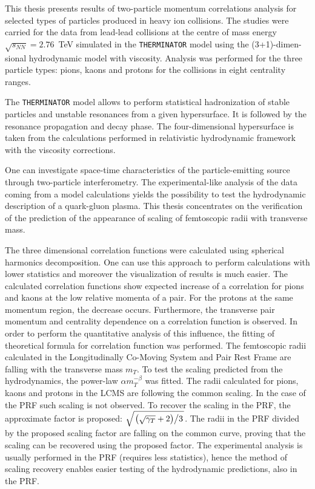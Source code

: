 
This thesis presents results of two-particle momentum correlations analysis for selected types of particles produced in heavy ion collisions.
The studies were carried for the data from lead-lead collisions at the centre of mass energy \mbox{$\sqrt{s_{NN}}=2.76$~TeV} simulated in the \verb|THERMINATOR| model using the (3+1)-dimen-sional hydrodynamic model with viscosity.
Analysis was performed for the three particle types: pions, kaons and protons for the collisions in eight centrality ranges.

The \verb|THERMINATOR| model allows to perform statistical hadronization of stable particles and unstable resonances from a given hypersurface.
It is followed by the resonance propagation and decay phase.
The four-dimensional hypersurface is taken from the calculations performed in relativistic hydrodynamic framework with the viscosity corrections.

One can investigate space-time characteristics of the particle-emitting source through two-particle interferometry.
The experimental-like analysis of the data coming from a model calculations yields the possibility to test the hydrodynamic description of a quark-gluon plasma.
This thesis concentrates on the verification of the prediction of the appearance of scaling of femtoscopic radii with transverse mass.

The three dimensional correlation functions were calculated using spherical harmonics decomposition.
One can use this approach to perform calculations with lower statistics and moreover the visualization of results is much easier.
The calculated correlation functions show expected increase of a correlation for pions and kaons at the low relative momenta of a pair.
For the protons at the same momentum region, the decrease occurs.
Furthermore, the transverse pair momentum and centrality dependence on a correlation function is observed.
In order to perform the quantitative analysis of this influence, the fitting of theoretical formula for correlation function was performed.
The femtoscopic radii calculated in the Longitudinally Co-Moving System and Pair Rest Frame are falling with the transverse mass $m_T$.
To test the scaling predicted from the hydrodynamics, the power-law $\alpha m_T^{-\beta}$ was fitted.
The radii calculated for pions, kaons and protons in the LCMS are following the common scaling.
In the case of the PRF such scaling is not observed.
To recover the scaling in the PRF, the approximate factor is proposed: $\sqrt{ \left. \left( \sqrt{\gamma_T} + 2 \right) \middle/ 3 \right. }$.
The radii in the PRF divided by the proposed scaling factor are falling on the common curve, proving that the scaling can be recovered using the proposed factor.
The experimental analysis is usually performed in the PRF (requires less statistics), hence the method of scaling recovery enables easier testing of the hydrodynamic predictions, also in the PRF.
